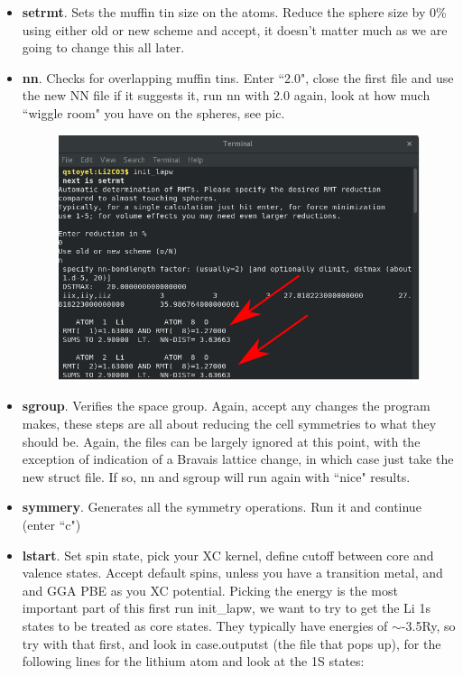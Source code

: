 \documentclass[12pt]{article}
\begin{document}
\begin{itemize}
	\item \textbf{setrmt}. Sets the muffin tin size on the atoms.  Reduce the sphere size by 0\% using either old or new scheme and accept, it doesn't matter much as we are going to change this all later.
	\item  \textbf{nn}.  Checks for overlapping muffin tins. Enter ``2.0", close the first file and use the new NN file if it suggests it, run nn with 2.0 again, look at how much ``wiggle room" you have on the spheres, see pic. 
	
	\begin{figure}[H]
		\includegraphics[scale=0.4]{./images/init_lapw2.png}
	\end{figure}
	
	\item \textbf{sgroup}. Verifies the space group.  Again, accept any changes the program makes, these steps are all about reducing the cell symmetries to what they should be. Again, the files can be largely  ignored at this point, with the exception of indication of a Bravais lattice change, in which case just take the new struct file. If so, nn and sgroup will run again with ``nice" results.  
	\item  \textbf{symmery}. Generates all the symmetry operations. Run it and continue (enter ``c")
	\item  \textbf{lstart}. Set spin state, pick your XC kernel, define cutoff between core and valence states.  Accept default spins, unless you have a transition metal, and  and GGA PBE as you XC potential. Picking the energy is the most important part of this first run init\_lapw, we want to try to get the Li 1s states to be treated as core states.  They typically have energies of $\sim$-3.5Ry, so try with that first, and look in case.outputst (the file that pops up), for the following lines for the lithium atom and look at the 1S states:  
	

\end{itemize}
\end{document}
